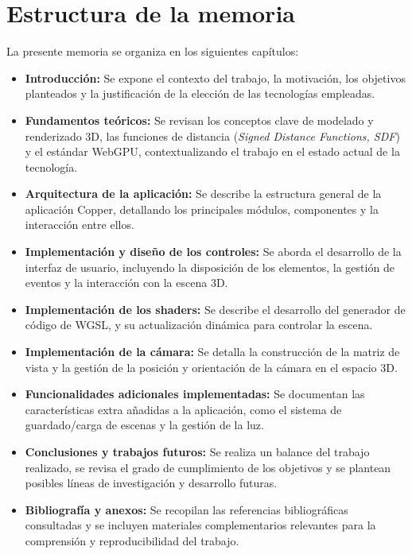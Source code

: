 \section{Estructura de la memoria}

La presente memoria se organiza en los siguientes capítulos:

\begin{itemize}
    \item \textbf{Introducción:} Se expone el contexto del trabajo, la motivación, los objetivos planteados y la justificación de la elección de las tecnologías empleadas.
    \item \textbf{Fundamentos teóricos:} Se revisan los conceptos clave de modelado y renderizado 3D, las funciones de distancia (\textit{Signed Distance Functions, SDF}) y el estándar WebGPU, contextualizando el trabajo en el estado actual de la tecnología.
    \item \textbf{Arquitectura de la aplicación:} Se describe la estructura general de la aplicación Copper, detallando los principales módulos, componentes y la interacción entre ellos.
    \item \textbf{Implementación y diseño de los controles:} Se aborda el desarrollo de la interfaz de usuario, incluyendo la disposición de los elementos, la gestión de eventos y la interacción con la escena 3D.
    \item \textbf{Implementación de los shaders:} Se describe el desarrollo del generador de código de WGSL, y su actualización dinámica para controlar la escena.
    \item \textbf{Implementación de la cámara:} Se detalla la construcción de la matriz de vista y la gestión de la posición y orientación de la cámara en el espacio 3D.
    \item \textbf{Funcionalidades adicionales implementadas:} Se documentan las características extra añadidas a la aplicación, como el sistema de guardado/carga de escenas y la gestión de la luz.
    \item \textbf{Conclusiones y trabajos futuros:} Se realiza un balance del trabajo realizado, se revisa el grado de cumplimiento de los objetivos y se plantean posibles líneas de investigación y desarrollo futuras.
    \item \textbf{Bibliografía y anexos:} Se recopilan las referencias bibliográficas consultadas y se incluyen materiales complementarios relevantes para la comprensión y reproducibilidad del trabajo.
\end{itemize}